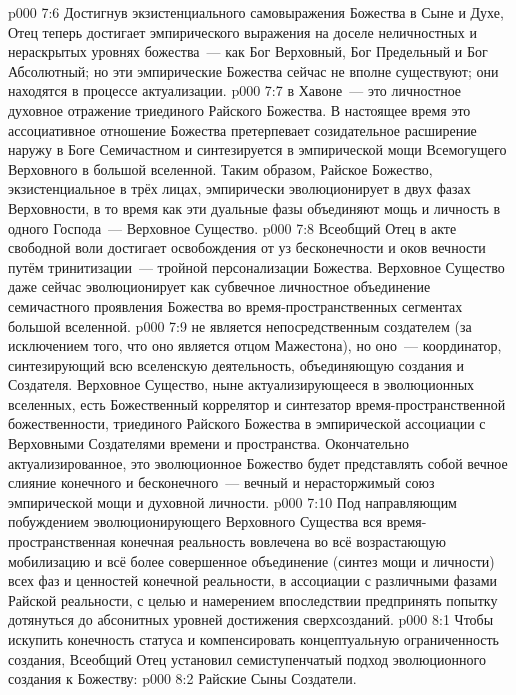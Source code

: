 \vs p000 7:6 Достигнув экзистенциального самовыражения Божества в Сыне и Духе, Отец теперь достигает эмпирического выражения на доселе неличностных и нераскрытых уровнях божества~--- как Бог Верховный, Бог Предельный и Бог Абсолютный; но эти эмпирические Божества сейчас не вполне существуют; они находятся в процессе актуализации.
\vs p000 7:7 \pc {} в Хавоне~--- это личностное духовное отражение триединого Райского Божества. В настоящее время это ассоциативное отношение Божества претерпевает созидательное расширение наружу в Боге Семичастном и синтезируется в эмпирической мощи Всемогущего Верховного в большой вселенной. Таким образом, Райское Божество, экзистенциальное в трёх лицах, эмпирически эволюционирует в двух фазах Верховности, в то время как эти дуальные фазы объединяют мощь и личность в одного Господа~--- Верховное Существо.
\vs p000 7:8 Всеобщий Отец в акте свободной воли достигает освобождения от уз бесконечности и оков вечности путём тринитизации~--- тройной персонализации Божества. Верховное Существо даже сейчас эволюционирует как субвечное личностное объединение семичастного проявления Божества во время\hyp{}пространственных сегментах большой вселенной.
\vs p000 7:9 \pc {} не является непосредственным создателем (за исключением того, что оно является отцом Мажестона), но оно~--- координатор, синтезирующий всю вселенскую деятельность, объединяющую создания и Создателя. Верховное Существо, ныне актуализирующееся в эволюционных вселенных, есть Божественный коррелятор и синтезатор время\hyp{}пространственной божественности, триединого Райского Божества в эмпирической ассоциации с Верховными Создателями времени и пространства. Окончательно актуализированное, это эволюционное Божество будет представлять собой вечное слияние конечного и бесконечного~--- вечный и нерасторжимый союз эмпирической мощи и духовной личности.
\vs p000 7:10 Под направляющим побуждением эволюционирующего Верховного Существа вся время\hyp{}пространственная конечная реальность вовлечена во всё возрастающую мобилизацию и всё более совершенное объединение (синтез мощи и личности) всех фаз и ценностей конечной реальности, в ассоциации с различными фазами Райской реальности, с целью и намерением впоследствии предпринять попытку дотянуться до абсонитных уровней достижения сверхсозданий.
\vs p000 8:1 Чтобы искупить конечность статуса и компенсировать концептуальную ограниченность создания, Всеобщий Отец установил семиступенчатый подход эволюционного создания к Божеству:
\vs p000 8:2 Райские Сыны Создатели.
